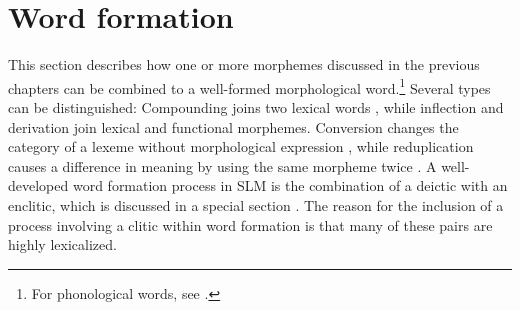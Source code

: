 \chapter{Word formation}\label{sec:form:WordFormation}
\glossSTDmode
This section describes how one or more morphemes discussed in the previous chapters can be combined to a well-formed morphological word.\footnote{For phonological words, see .}
Several types can be distinguished: Compounding joins two lexical words , while inflection  and derivation  join lexical and functional morphemes. Conversion changes the category of a lexeme without morphological expression , while reduplication causes a difference in meaning by using the same morpheme twice .
A well-developed word formation process in SLM is the combination of a deictic with an enclitic, which is discussed in a special section . The reason for the inclusion of a process involving a clitic within word formation is that many of these pairs are highly lexicalized.

